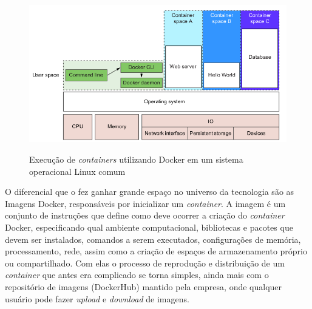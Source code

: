 	\begin{figure}[htb]
		\caption{Execução de \textit{containers} utilizando Docker em um sistema operacional Linux comum}
		{\parbox{6cm}{
				\includegraphics[width=15cm]{images/docker-daemon.png}
				\label{fig:Docker-daemon}
		}}
	\end{figure}

O diferencial que o fez ganhar grande espaço no universo da tecnologia são as Imagens Docker, responsáveis por inicializar um \textit{container}. A imagem é um conjunto de instruções que define como deve ocorrer a criação do \textit{container} Docker, especificando qual ambiente computacional, bibliotecas e pacotes que devem ser instalados, comandos a serem executados, configurações de memória, processamento, rede, assim como a criação de espaços de armazenamento próprio ou compartilhado. Com elas o processo de reprodução e distribuição de um \textit{container} que antes era complicado se torna simples, ainda mais com o repositório de imagens (DockerHub) mantido pela empresa, onde qualquer usuário pode fazer \textit{upload} e \textit{download} de imagens.



